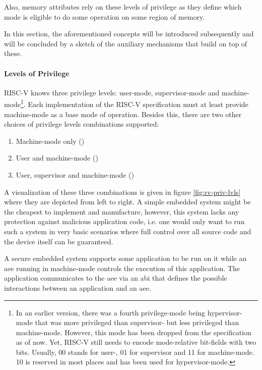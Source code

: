 Also, memory attributes rely on these levels of privilege as they define which mode is eligible to do some operation on some region of memory.

In this section, the aforementioned concepts will be introduced subsequently and will be concluded by a sketch of the auxiliary mechanisms that build on top of these.

\paragraph{Levels of Privilege}

RISC-V knows three privilege levels: user-mode, supervisor-mode and machine-mode\footnote{%
    In an earlier version, there was a fourth privilege-mode being hypervisor-mode that was more privileged than supervisor- but less privileged than machine-mode.
    However, this mode has been dropped from the specification as of now.
    Yet, RISC-V still needs to encode mode-relative bit-fields with two bits.
    Usually, 00 stands for user-, 01 for supervisor and 11 for machine-mode.
    10 is reserved in most places and has been used for hypervisor-mode.
}.
Each implementation of the RISC-V specification must at least provide machine-mode as a base mode of operation.
Besides this, there are two other choices of privilege levels combinations supported:
\begin{enumerate}
    \item Machine-mode only ()
    \item User and machine-mode ()
    \item User, supervisor and machine-mode ()
\end{enumerate}

A visualization of these three combinations is given in figure \ref{fig:rv-priv-lvls} where they are depicted from left to right.
A simple embedded system might be the cheapest to implement and manufacture, however, this system lacks any protection against malicious application code, i.e. one would only want to run such a system in very basic scenarios where full control over all source code and the device itself can be guaranteed.

A secure embedded system supports some application to be run on it while an \gls{aee} running in machine-mode controls the execution of this application.
The application communicates to the \gls{aee} via an \gls{abi} that defines the possible interactions between an application and an \gls{aee}.

